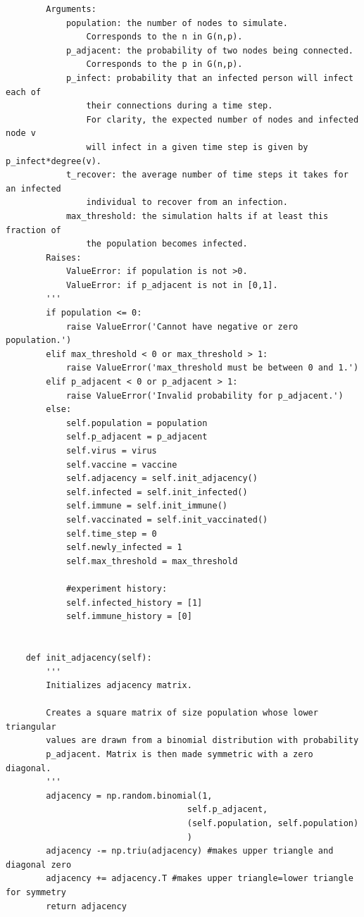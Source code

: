 \documentclass[psamsfonts]{amsart}
\theoremstyle{definition}
\theoremstyle{remark}
\numberwithin{equation}{section}
\begin{document}
\begin{verbatim}
        Arguments:
            population: the number of nodes to simulate.
                Corresponds to the n in G(n,p).
            p_adjacent: the probability of two nodes being connected.
                Corresponds to the p in G(n,p).
            p_infect: probability that an infected person will infect each of
                their connections during a time step.
                For clarity, the expected number of nodes and infected node v
                will infect in a given time step is given by p_infect*degree(v).
            t_recover: the average number of time steps it takes for an infected
                individual to recover from an infection.
            max_threshold: the simulation halts if at least this fraction of
                the population becomes infected.
        Raises:
            ValueError: if population is not >0.
            ValueError: if p_adjacent is not in [0,1].
        '''
        if population <= 0:
            raise ValueError('Cannot have negative or zero population.')
        elif max_threshold < 0 or max_threshold > 1:
            raise ValueError('max_threshold must be between 0 and 1.')
        elif p_adjacent < 0 or p_adjacent > 1:
            raise ValueError('Invalid probability for p_adjacent.')
        else:
            self.population = population
            self.p_adjacent = p_adjacent
            self.virus = virus
            self.vaccine = vaccine
            self.adjacency = self.init_adjacency()
            self.infected = self.init_infected()
            self.immune = self.init_immune()
            self.vaccinated = self.init_vaccinated()
            self.time_step = 0
            self.newly_infected = 1
            self.max_threshold = max_threshold

            #experiment history:
            self.infected_history = [1]
            self.immune_history = [0]


    def init_adjacency(self):
        '''
        Initializes adjacency matrix.

        Creates a square matrix of size population whose lower triangular
        values are drawn from a binomial distribution with probability
        p_adjacent. Matrix is then made symmetric with a zero diagonal.
        '''
        adjacency = np.random.binomial(1,
                                    self.p_adjacent,
                                    (self.population, self.population)
                                    )
        adjacency -= np.triu(adjacency) #makes upper triangle and diagonal zero
        adjacency += adjacency.T #makes upper triangle=lower triangle for symmetry
        return adjacency


\end{verbatim}
\end{document}
